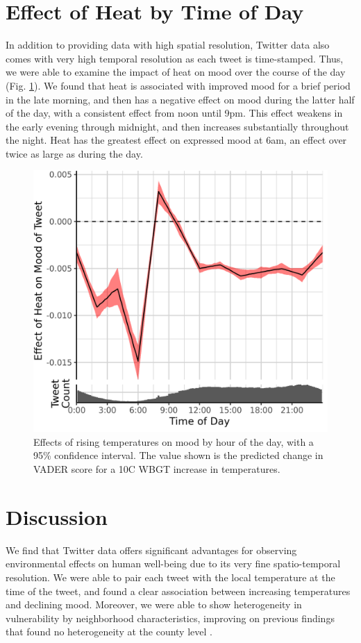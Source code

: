 \documentclass[fleqn,10pt]{wlscirep}
\begin{document}
\section*{Effect of Heat by Time of Day}
In addition to providing data with high spatial resolution, Twitter data also comes with very high temporal resolution as each tweet is time-stamped. Thus, we were able to examine the impact of heat on mood over the course of the day (Fig. \ref{fig:ts-wbgt}). We found that heat is associated with improved mood for a brief period in the late morning, and then has a negative effect on mood during the latter half of the day, with a consistent effect from noon until 9pm. This effect weakens in the early evening through midnight, and then increases substantially throughout the night. Heat has the greatest effect on expressed mood at 6am, an effect over twice as large as during the day.

\begin{figure}[H]
 \centering
 \includegraphics[width=0.5\linewidth]{../res/ts_heat.png}
 \caption{Effects of rising temperatures on mood by hour of the day, with a 95\% confidence interval. The value shown is the predicted change in VADER score for a 10\textdegree C WBGT increase in temperatures.}
 \label{fig:ts-wbgt}
\end{figure}

\section*{Discussion}
We find that Twitter data offers significant advantages for observing environmental effects on human well-being due to its very fine spatio-temporal resolution. We were able to pair each tweet with the local temperature at the time of the tweet, and found a clear association between increasing temperatures and declining mood. Moreover, we were able to show heterogeneity in vulnerability by neighborhood characteristics, improving on previous findings that found no heterogeneity at the county level \cite{Burke2018Aug, Mullins2019Dec}.
\end{document}
